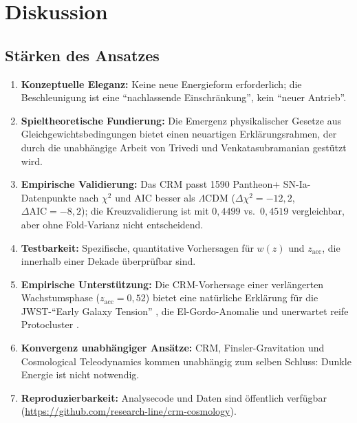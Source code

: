 \documentclass[aps,prd,twocolumn,superscriptaddress,nofootinbib]{revtex4-2}
\begin{document}
\section{Diskussion}
\label{sec:diskussion}

\subsection{St\"arken des Ansatzes}

\begin{enumerate}
\item \textbf{Konzeptuelle Eleganz:} Keine neue Energieform erforderlich; die Beschleunigung ist eine ``nachlassende Einschr\"ankung'', kein ``neuer Antrieb''.
\item \textbf{Spieltheoretische Fundierung:} Die Emergenz physikalischer Gesetze aus Gleichgewichtsbedingungen bietet einen neuartigen Erkl\"arungsrahmen, der durch die unabh\"angige Arbeit von Trivedi und Venkatasubramanian \cite{Trivedi2025} gest\"utzt wird.
\item \textbf{Empirische Validierung:} Das CRM passt 1590 Pantheon+ SN-Ia-Datenpunkte nach $\chi^2$ und AIC besser als $\Lambda$CDM ($\Delta\chi^2 = -12{,}2$, $\Delta\mathrm{AIC} = -8{,}2$); die Kreuzvalidierung ist mit $0{,}4499$ vs.\ $0{,}4519$ vergleichbar, aber ohne Fold-Varianz nicht entscheidend.
\item \textbf{Testbarkeit:} Spezifische, quantitative Vorhersagen f\"ur $w(z)$ und $z_{\mathrm{acc}}$, die innerhalb einer Dekade \"uberpr\"ufbar sind.
\item \textbf{Empirische Unterst\"utzung:} Die CRM-Vorhersage einer verl\"angerten Wachstumsphase ($z_{\mathrm{acc}} = 0{,}52$) bietet eine nat\"urliche Erkl\"arung f\"ur die JWST-``Early Galaxy Tension'' \cite{Labbe2023, BoylanKolchin2023}, die El-Gordo-Anomalie \cite{Asencio2023} und unerwartet reife Protocluster \cite{Miller2018}.
\item \textbf{Konvergenz unabh\"angiger Ans\"atze:} CRM, Finsler-Gravitation und Cosmological Teleodynamics kommen unabh\"angig zum selben Schluss: Dunkle Energie ist nicht notwendig.
\item \textbf{Reproduzierbarkeit:} Analysecode und Daten sind \"offentlich verf\"ugbar (\url{https://github.com/research-line/crm-cosmology}).
\end{enumerate}
\end{document}
